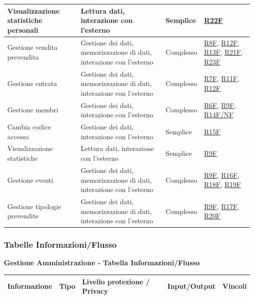\documentclass[a4paper]{article}
\begin{document}
\begin{center}
\begin{tabularx}{1\textwidth}{|X|X|X|X|}
        \hline
        Visualizzazione statistiche personali & Lettura dati, interazione con l'esterno & Semplice &  \hyperlink{R22F}{R22F} \\
        \hline
        Gestione vendita prevendita & Gestione dei dati, memorizzazione di dati, interazione con l'esterno & Complesso & \hyperlink{R8F}{R8F}, \hyperlink{R12F}{R12F}, \hyperlink{R13F}{R13F}, \hyperlink{R21F}{R21F}, \hyperlink{R23F}{R23F} \\
        \hline
        Gestione entrata & Gestione dei dati, memorizzazione di dati, interazione con l'esterno & Complesso & \hyperlink{R7F}{R7F}, \hyperlink{R11F}{R11F}, \hyperlink{R12F}{R12F} \\
        \hline
        Gestione membri & Gestione dei dati, interazione con l'esterno & Complesso & \hyperlink{R6F}{R6F}, \hyperlink{R9F}{R9F}, \hyperlink{R14F/NF}{R14F/NF} \\
        \hline
        Cambia codice accesso & Gestione dei dati, interazione con l'esterno & Semplice & \hyperlink{R15F}{R15F}  \\
        \hline
        Visualizzazione statistiche & Lettura dati, interazione con l'esterno & Semplice & \hyperlink{R9F}{R9F}  \\
        \hline
        Gestione eventi & Gestione dei dati, memorizzazione di dati, interazione con l'esterno & Complesso & \hyperlink{R9F}{R9F}, \hyperlink{R16F}{R16F}, \hyperlink{R18F}{R18F}, \hyperlink{R19F}{R19F} \\
        \hline
        Gestione tipologie prevendite & Gestione dei dati, memorizzazione di dati, interazione con l'esterno & Complesso & \hyperlink{R9F}{R9F}, \hyperlink{R17F}{R17F}, \hyperlink{R20F}{R20F} \\
        \hline
    \end{tabularx}
\end{center}

\newpage

\subsubsection{Tabelle Informazioni/Flusso}

\textbf{Gestione Amministrazione - Tabella Informazioni/Flusso}

\begin{center}
    \begin{tabularx}{1\textwidth}{|X|l|X|X|X|}
        \hline
        \textbf{Informazione} &\textbf{Tipo} & \textbf{Livello protezione / Privacy} & \textbf{Input/Output} & \textbf{Vincoli}\\
        \hline
        \hline
    \end{tabularx}
\end{center}
\end{document}
